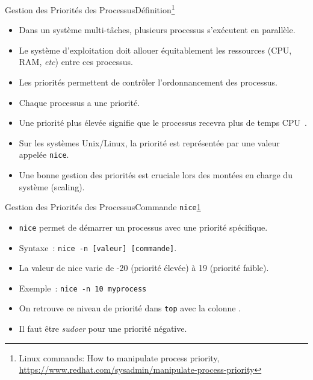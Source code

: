 \documentclass{beamer}
\begin{document}
    \begin{frame}{Gestion des Priorités des Processus}{Définition\footnote{\label{process-priority}Linux commands: How to manipulate process priority, \url{https://www.redhat.com/sysadmin/manipulate-process-priority}}}
        \begin{itemize}
            \item Dans un système multi-tâches, plusieurs processus s'exécutent en parallèle.
            \item Le système d'exploitation doit allouer équitablement les ressources (CPU, RAM, \textit{etc}) entre ces processus.
            \item Les priorités permettent de contrôler l'ordonnancement des processus.
            \item Chaque processus a une priorité.
            \item Une priorité plus élevée signifie que le processus recevra plus de temps CPU~.
            \item Sur les systèmes Unix/Linux, la priorité est représentée par une valeur appelée \lstinline{nice}.
            \item Une bonne gestion des priorités est cruciale lors des montées en charge du système (scaling).
        \end{itemize}
    \end{frame}

    \begin{frame}{Gestion des Priorités des Processus}{Commande \lstinline{nice}\cref{process-priority}}
        \begin{itemize}
            \item \lstinline{nice} permet de démarrer un processus avec une priorité spécifique.
            \item Syntaxe~: \lstinline{nice -n [valeur] [commande]}.
            \item La valeur de nice varie de -20 (priorité élevée) à 19 (priorité faible).
            \item Exemple~: \lstinline{nice -n 10 myprocess}
            \item On retrouve ce niveau de priorité dans \lstinline{top} avec la colonne .
            \item Il faut être \textit{sudoer} pour une priorité négative.
        \end{itemize}
    \end{frame}
\end{document}
